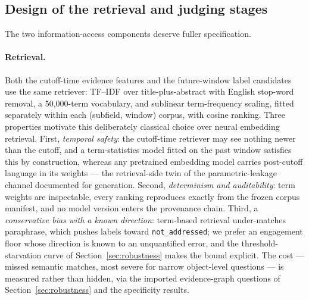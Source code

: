 \documentclass[11pt]{article}
\begin{document}
\subsection{Design of the retrieval and judging stages}
\label{sec:pipeline}

The two information-access components deserve fuller specification.

\paragraph{Retrieval.} Both the cutoff-time evidence features and the
future-window label candidates use the same retriever: TF--IDF over
title-plus-abstract with English stop-word removal, a 50{,}000-term
vocabulary, and sublinear term-frequency scaling, fitted separately
within each (subfield, window) corpus, with cosine ranking. Three
properties motivate this deliberately classical choice over neural
embedding retrieval. First, \emph{temporal safety}: the cutoff-time
retriever may see nothing newer than the cutoff, and a term-statistics
model fitted on the past window satisfies this by construction, whereas
any pretrained embedding model carries post-cutoff language in its
weights --- the retrieval-side twin of the parametric-leakage channel
documented for generation. Second, \emph{determinism and auditability}:
term weights are inspectable, every ranking reproduces exactly from the
frozen corpus manifest, and no model version enters the provenance
chain. Third, a \emph{conservative bias with a known direction}:
term-based retrieval under-matches paraphrase, which pushes labels
toward \texttt{not\_addressed}; we prefer an engagement floor whose
direction is known to an unquantified error, and the
threshold-starvation curve of Section~\ref{sec:robustness} makes the
bound explicit. The cost --- missed semantic matches, most severe for
narrow object-level questions --- is measured rather than hidden, via
the imported evidence-graph questions of Section~\ref{sec:robustness}
and the specificity results.
\end{document}

